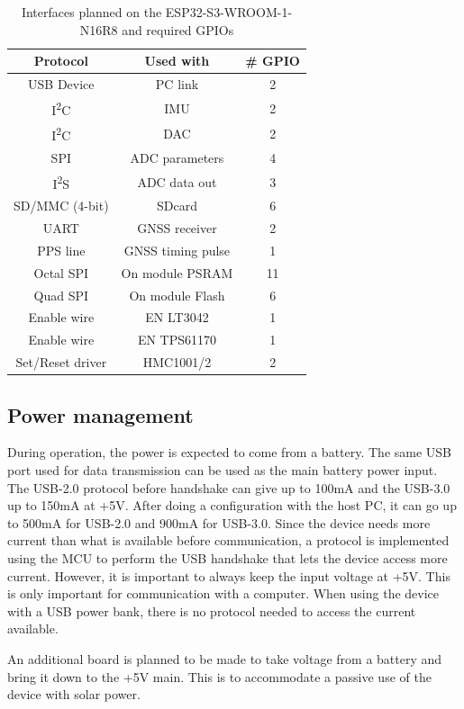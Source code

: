 \documentclass[11pt]{article}
\begin{document}
\begin{table}[htbp!]
\centering
\setlength{\tabcolsep}{30pt}
\caption{Interfaces planned on the ESP32-S3-WROOM-1-N16R8 and required GPIOs}
\label{tab:interfaces-gpio}
\begin{tabular}{c  c  c}
\toprule
\textbf{Protocol} & \textbf{Used with} & \textbf{\# GPIO} \\
\midrule
USB Device & PC link & 2 \\
I\textsuperscript{2}C  & IMU & 2 \\
I\textsuperscript{2}C  & DAC & 2 \\
SPI & ADC parameters & 4  \\
I\textsuperscript{2}S & ADC data out & 3 \\
SD/MMC (4-bit) & SDcard  & 6 \\
UART & GNSS receiver & 2 \\
PPS line & GNSS timing pulse & 1 \\
Octal SPI & On module PSRAM & 11 \\
Quad SPI & On module Flash & 6 \\
Enable wire & EN LT3042 & 1 \\
Enable wire & EN TPS61170 & 1 \\
Set/Reset driver & HMC1001/2 & 2 \\
\bottomrule
\end{tabular}

\end{table}

\subsection{Power management}
During operation, the power is expected to come from a battery. The same USB port used for data
transmission can be used as the main battery power input. The USB-2.0 protocol before handshake 
can give up to 100mA and the USB-3.0 up to 150mA at +5V. After doing a configuration with the host PC,
it can go up to 500mA for USB-2.0 and 900mA for USB-3.0. Since the device needs more current than
what is available before communication, a protocol is implemented using the MCU to perform the
USB handshake that lets the device access more current. However, it is important to always keep the 
input voltage at +5V. This is only important for communication with a computer. When using 
the device with a USB power bank, there is no protocol needed to access the current available.

An additional board is planned to be made to take voltage from a battery and bring it down to the 
+5V main. This is to accommodate a passive use of the device with solar power.
\end{document}
